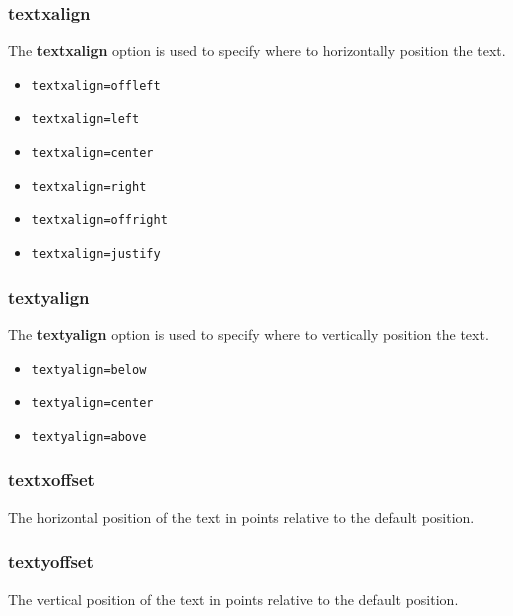 \hypertarget{textxalign}{%
\subsubsection{textxalign}\label{textxalign}}

The \textbf{textxalign} option is used to specify where to horizontally
position the text.

\begin{itemize}
\tightlist
\item
  \texttt{textxalign=offleft}
\item
  \texttt{textxalign=left}
\item
  \texttt{textxalign=center}
\item
  \texttt{textxalign=right}
\item
  \texttt{textxalign=offright}
\item
  \texttt{textxalign=justify}
\end{itemize}

\hypertarget{textyalign}{%
\subsubsection{textyalign}\label{textyalign}}

The \textbf{textyalign} option is used to specify where to vertically
position the text.

\begin{itemize}
\tightlist
\item
  \texttt{textyalign=below}
\item
  \texttt{textyalign=center}
\item
  \texttt{textyalign=above}
\end{itemize}

\hypertarget{textxoffset}{%
\subsubsection{textxoffset}\label{textxoffset}}

The horizontal position of the text in points relative to the default
position.

\hypertarget{textyoffset}{%
\subsubsection{textyoffset}\label{textyoffset}}

The vertical position of the text in points relative to the default
position.


